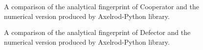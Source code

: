 \begin{figure}[htbp!]
\caption{A comparison of the analytical fingerprint of Cooperator and the numerical version produced by Axelrod-Python library.}
\label{fig:Cooperator-comparison}
\end{figure}
\begin{figure}[htbp!]
\caption{A comparison of the analytical fingerprint of Defector and the numerical version produced by Axelrod-Python library.}
\label{fig:Defector-comparison}
\end{figure}
